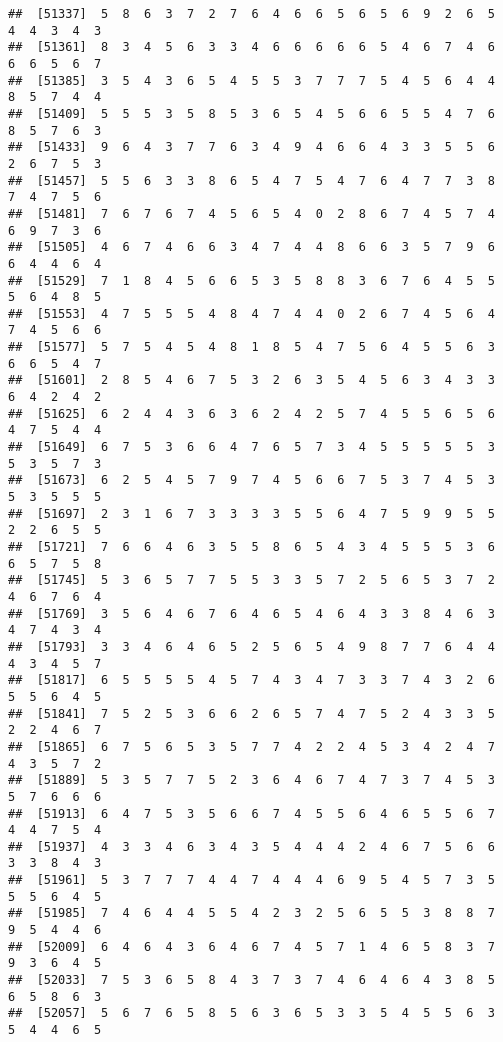 \documentclass[
]{book}
\begin{document}
\begin{verbatim}
##  [51337]  5  8  6  3  7  2  7  6  4  6  6  5  6  5  6  9  2  6  5  4  4  3  4  3
##  [51361]  8  3  4  5  6  3  3  4  6  6  6  6  6  5  4  6  7  4  6  6  6  5  6  7
##  [51385]  3  5  4  3  6  5  4  5  5  3  7  7  7  5  4  5  6  4  4  8  5  7  4  4
##  [51409]  5  5  5  3  5  8  5  3  6  5  4  5  6  6  5  5  4  7  6  8  5  7  6  3
##  [51433]  9  6  4  3  7  7  6  3  4  9  4  6  6  4  3  3  5  5  6  2  6  7  5  3
##  [51457]  5  5  6  3  3  8  6  5  4  7  5  4  7  6  4  7  7  3  8  7  4  7  5  6
##  [51481]  7  6  7  6  7  4  5  6  5  4  0  2  8  6  7  4  5  7  4  6  9  7  3  6
##  [51505]  4  6  7  4  6  6  3  4  7  4  4  8  6  6  3  5  7  9  6  6  4  4  6  4
##  [51529]  7  1  8  4  5  6  6  5  3  5  8  8  3  6  7  6  4  5  5  5  6  4  8  5
##  [51553]  4  7  5  5  5  4  8  4  7  4  4  0  2  6  7  4  5  6  4  7  4  5  6  6
##  [51577]  5  7  5  4  5  4  8  1  8  5  4  7  5  6  4  5  5  6  3  6  6  5  4  7
##  [51601]  2  8  5  4  6  7  5  3  2  6  3  5  4  5  6  3  4  3  3  6  4  2  4  2
##  [51625]  6  2  4  4  3  6  3  6  2  4  2  5  7  4  5  5  6  5  6  4  7  5  4  4
##  [51649]  6  7  5  3  6  6  4  7  6  5  7  3  4  5  5  5  5  5  3  5  3  5  7  3
##  [51673]  6  2  5  4  5  7  9  7  4  5  6  6  7  5  3  7  4  5  3  5  3  5  5  5
##  [51697]  2  3  1  6  7  3  3  3  3  5  5  6  4  7  5  9  9  5  5  2  2  6  5  5
##  [51721]  7  6  6  4  6  3  5  5  8  6  5  4  3  4  5  5  5  3  6  6  5  7  5  8
##  [51745]  5  3  6  5  7  7  5  5  3  3  5  7  2  5  6  5  3  7  2  4  6  7  6  4
##  [51769]  3  5  6  4  6  7  6  4  6  5  4  6  4  3  3  8  4  6  3  4  7  4  3  4
##  [51793]  3  3  4  6  4  6  5  2  5  6  5  4  9  8  7  7  6  4  4  4  3  4  5  7
##  [51817]  6  5  5  5  5  4  5  7  4  3  4  7  3  3  7  4  3  2  6  5  5  6  4  5
##  [51841]  7  5  2  5  3  6  6  2  6  5  7  4  7  5  2  4  3  3  5  2  2  4  6  7
##  [51865]  6  7  5  6  5  3  5  7  7  4  2  2  4  5  3  4  2  4  7  4  3  5  7  2
##  [51889]  5  3  5  7  7  5  2  3  6  4  6  7  4  7  3  7  4  5  3  5  7  6  6  6
##  [51913]  6  4  7  5  3  5  6  6  7  4  5  5  6  4  6  5  5  6  7  4  4  7  5  4
##  [51937]  4  3  3  4  6  3  4  3  5  4  4  4  2  4  6  7  5  6  6  3  3  8  4  3
##  [51961]  5  3  7  7  7  4  4  7  4  4  4  6  9  5  4  5  7  3  5  5  5  6  4  5
##  [51985]  7  4  6  4  4  5  5  4  2  3  2  5  6  5  5  3  8  8  7  9  5  4  4  6
##  [52009]  6  4  6  4  3  6  4  6  7  4  5  7  1  4  6  5  8  3  7  9  3  6  4  5
##  [52033]  7  5  3  6  5  8  4  3  7  3  7  4  6  4  6  4  3  8  5  6  5  8  6  3
##  [52057]  5  6  7  6  5  8  5  6  3  6  5  3  3  5  4  5  5  6  3  5  4  4  6  5

\end{verbatim}
\end{document}
